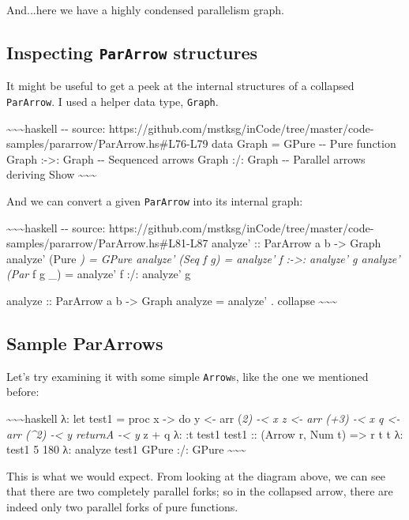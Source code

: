 \documentclass[]{article}
\begin{document}
And...here we have a highly condensed parallelism graph.

\subsection{\texorpdfstring{Inspecting \texttt{ParArrow}
structures}{Inspecting ParArrow structures}}

It might be useful to get a peek at the internal structures of a collapsed
\texttt{ParArrow}. I used a helper data type, \texttt{Graph}.

\textasciitilde{}\textasciitilde{}\textasciitilde{}haskell -\/- source:
https://github.com/mstksg/inCode/tree/master/code-samples/pararrow/ParArrow.hs\#L76-L79
data Graph = GPure -\/- Pure function \textbar{} Graph :-\textgreater{}: Graph
-\/- Sequenced arrows \textbar{} Graph :/: Graph -\/- Parallel arrows deriving
Show \textasciitilde{}\textasciitilde{}\textasciitilde{}

And we can convert a given \texttt{ParArrow} into its internal graph:

\textasciitilde{}\textasciitilde{}\textasciitilde{}haskell -\/- source:
https://github.com/mstksg/inCode/tree/master/code-samples/pararrow/ParArrow.hs\#L81-L87
analyze' :: ParArrow a b -\textgreater{} Graph analyze' (Pure \emph{) = GPure
analyze' (Seq f g) = analyze' f :-\textgreater{}: analyze' g analyze' (Par } f g
\_) = analyze' f :/: analyze' g

analyze :: ParArrow a b -\textgreater{} Graph analyze = analyze' . collapse
\textasciitilde{}\textasciitilde{}\textasciitilde{}

\subsection{Sample ParArrows}

Let's try examining it with some simple \texttt{Arrow}s, like the one we
mentioned before:

\textasciitilde{}\textasciitilde{}\textasciitilde{}haskell λ: let test1 =
\textbar{} proc x -\textgreater{} do \textbar{} y \textless{}- arr (\emph{2)
-\textless{} x \textbar{} z \textless{}- arr (+3) -\textless{} x \textbar{} q
\textless{}- arr (\^{}2) -\textless{} y \textbar{} returnA -\textless{} y } z +
q λ: :t test1 test1 :: (Arrow r, Num t) =\textgreater{} r t t λ: test1 5 180 λ:
analyze test1 GPure :/: GPure
\textasciitilde{}\textasciitilde{}\textasciitilde{}

This is what we would expect. From looking at the diagram above, we can see that
there are two completely parallel forks; so in the collapsed arrow, there are
indeed only two parallel forks of pure functions.
\end{document}
